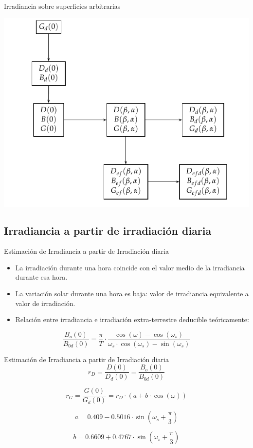 \documentclass[xcolor={usenames,svgnames,dvipsnames}]{beamer}
\begin{document}
\begin{frame}[label={sec:orgb68a1c3}]{Irradiancia sobre superficies arbitrarias}
\begin{center}
\includegraphics[width=.9\linewidth]{../figs/ProcedimientoCalculoRadiacionInclinada.pdf}
\end{center}
\end{frame}

\subsection{Irradiancia a partir de irradiación diaria}
\label{sec:org0c3dc30}

\begin{frame}[label={sec:org647d3e9}]{Estimación de Irradiancia a partir de Irradiación diaria}
\begin{itemize}
\item La irradiación durante una hora coincide con el valor medio de la irradiancia durante esa hora.

\item La variación solar durante una hora es baja: valor de irradiancia equivalente a valor de irradiación.

\item Relación entre irradiancia e irradiación extra-terrestre deducible teóricamente:
\end{itemize}

\[\frac{B_{o}(0)}{B_{0d}(0)}=\frac{\pi}{T}\cdot\frac{\cos(\omega)-\cos(\omega_{s})}{\omega_{s}\cdot\cos(\omega_{s})-\sin(\omega_{s})}\]
\end{frame}

\begin{frame}[label={sec:org60a6aaf}]{Estimación de Irradiancia a partir de Irradiación diaria}
\[r_{D}=\frac{D(0)}{D_{d}(0)}=\frac{B_{o}(0)}{B_{0d}(0)}\]

\[r_{G}=\frac{G(0)}{G_{d}(0)}=r_{D}\cdot\left(a+b\cdot\cos(\omega)\right)\]

\[a=0.409-0.5016\cdot\sin(\omega_{s}+\frac{\pi}{3})\]

\[b=0.6609+0.4767\cdot\sin(\omega_{s}+\frac{\pi}{3})\]
\end{frame}
\end{document}
